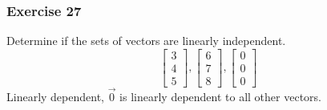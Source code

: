 \documentclass[letterpaper, 12pt]{math}
\begin{document}
\subsubsection*{Exercise 27}
Determine if the sets of vectors are linearly independent.
\[ \begin{bmatrix}3 \\ 4 \\ 5\end{bmatrix},
  \begin{bmatrix}6 \\ 7 \\ 8\end{bmatrix},
  \begin{bmatrix}0 \\ 0 \\ 0\end{bmatrix} \]
Linearly dependent, \( \vec{0} \) is linearly dependent to all other vectors.
\end{document}
